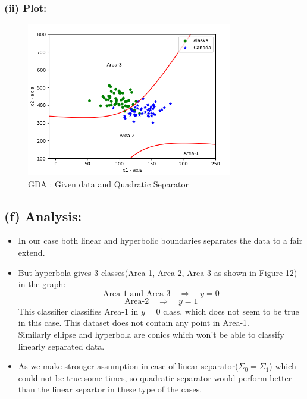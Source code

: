 \documentclass[a4 paper]{article}
\begin{document}
\subsubsection*{(ii) Plot:}

\begin{figure}[H]
	\centering
	  \includegraphics[width = 90mm]{./Plots/4b.png}
	  \caption{GDA : Given data and Quadratic Separator}
  	\label{fig8}
\end{figure}

\subsection*{(f) Analysis:}
\begin{itemize}
	\item In our case both linear and hyperbolic boundaries separates the data to a fair extend.
	\item But hyperbola gives 3 classes(Area-1, Area-2, Area-3 as shown in Figure 12) in the graph: \\
	$$\text{Area-1 and Area-3} \quad \Rightarrow \quad y=0 $$ 
	$$\text{Area-2} \quad \Rightarrow \quad y=1 $$ 
	This classifier classifies Area-1 in $y=0$ class, which does not seem to be true in this case. This dataset does not contain any point in Area-1. \\
	Similarly ellipse and hyperbola are conics which won't be able to classify linearly separated data.  
	\item As we make stronger assumption in case of linear separator($\Sigma_0 = \Sigma_1$) which could not be true some times, so quadratic separator would perform better than the linear separtor in these type of the cases.
\end{itemize}
\end{document}
